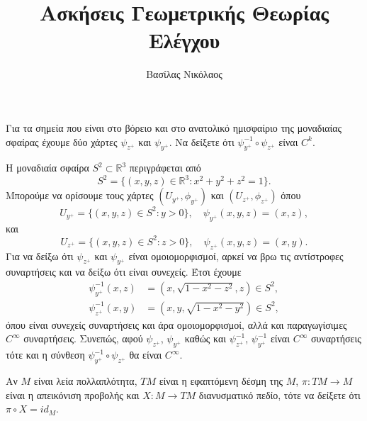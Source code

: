 \documentclass[a4paper,11pt]{article}
\newenvironment{exercise}[2][Άσκηση]
{\begin{trivlist}
    \item[\hskip \labelsep {\bfseries #1}\hskip \labelsep {\bfseries #2.}]}
{\end{trivlist}}
\newenvironment{solution}[2][Λύση]
{\begin{trivlist}
    \item[\hskip \labelsep {\bfseries #1}\hskip \labelsep {\bfseries #2.}]}
{\end{trivlist}}
\begin{document}
\title{Ασκήσεις Γεωμετρικής Θεωρίας Ελέγχου}
\author{Βασίλας Νικόλαος}
\maketitle
\begin{exercise}{1}
    Για τα σημεία που είναι στο βόρειο και στο ανατολικό ημισφαίριο της
    μοναδιαίας σφαίρας έχουμε δύο χάρτες $\psi_{z^+}$ και $\psi_{y^+}$. Να δείξετε
    ότι $\psi_{y^+}^{-1} \circ \psi_{z^+}$ είναι $C^k$.
\end{exercise}
\begin{solution}{1}
    Η μοναδιαία σφαίρα $S^2 \subset \mathbb{R}^3$ περιγράφεται από
    \begin{equation*}
        S^2 = \{ (x, y, z) \in \mathbb{R}^3: x^2 + y^2 + z^2 = 1\}.
    \end{equation*}
    Μπορούμε να ορίσουμε τους χάρτες $(U_{y^+}, \phi_{y^+})$ και $(U_{z^+},
    \phi_{z^+})$ όπου
    \begin{equation*}
        U_{y^+} = \{(x, y, z) \in S^2: y > 0\}, \quad \psi_{y^+}(x, y, z) = (x,
        z),
    \end{equation*}
    και
    \begin{equation*}
        U_{z^+} = \{(x, y, z) \in S^2: z > 0\}, \quad \psi_{z^+}(x, y, z) = (x,
        y).
    \end{equation*}
    Για να δείξω ότι $\psi_{z^+}$ και $\psi_{y^+}$ είναι ομοιομορφισμοί, αρκεί
    να βρω τις αντίστροφες συναρτήσεις και να δείξω ότι είναι συνεχείς. Έτσι
    έχουμε
    \begin{align*}
        \psi_{y^+}^{-1}(x, z) &= \left( x, \sqrt{1 - x^2 - z^2}, z \right) \in S^2,\\
        \psi_{z^+}^{-1}(x, y) &= \left( x, y, \sqrt{1 - x^2 - y^2} \right) \in S^2,
    \end{align*}
    όπου είναι συνεχείς συναρτήσεις και άρα ομοιομορφισμοί, αλλά και
    παραγωγίσιμες $C^{\infty}$ συναρτήσεις. Συνεπώς, αφού $\psi_{z^+}$,
    $\psi_{y^+}$ καθώς και $\psi_{z^+}^{-1}$, $\psi_{y^+}^{-1}$ είναι
    $C^{\infty}$ συναρτήσεις τότε και η σύνθεση
    $\psi_{y^+}^{-1} \circ \psi_{z^+}$ θα είναι $C^{\infty}$.
\end{solution}
\begin{exercise}{2}
    Αν $M$ είναι λεία πολλαπλότητα, $TM$ είναι η εφαπτόμενη δέσμη της $M$, $\pi:
    TM \rightarrow M$ είναι η απεικόνιση προβολής και $X: M \rightarrow TM$
    διανυσματικό πεδίο, τότε να δείξετε ότι $\pi \circ X = id_M$.
\end{exercise}
\end{document}
